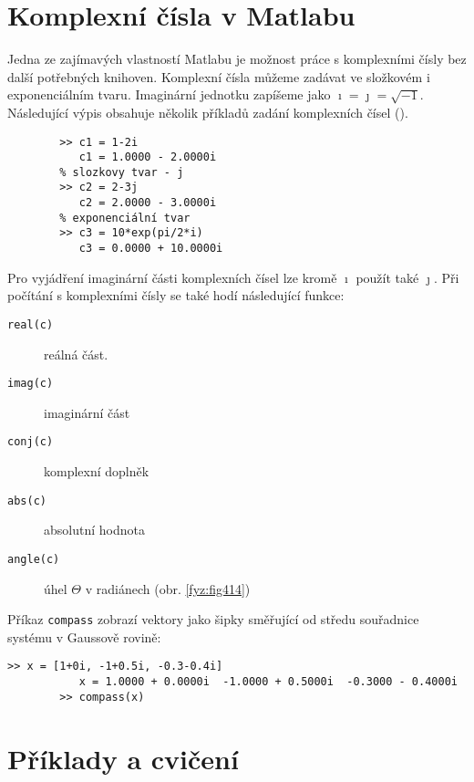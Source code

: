  \section{Komplexní čísla v Matlabu}\label{fyz:IchapXXIIsecVII}
    Jedna ze zajímavých vlastností Matlabu je možnost práce s komplexními čísly bez další potřebných
    knihoven. Komplexní čísla můžeme zadávat ve složkovém i exponenciálním tvaru. Imaginární
    jednotku zapíšeme jako \(\imath = \jmath = \sqrt{-1}\). Následující výpis obsahuje několik
    příkladů zadání komplexních čísel (\cite[s.~30]{Karban2006}).
    \begin{mdframed}[style=mdmsdos]
      \begin{lstlisting}[style=luaMaltabext,gobble=8]
        % slozkovy tvar - i
        >> c1 = 1-2i 
           c1 = 1.0000 - 2.0000i
        % slozkovy tvar - j
        >> c2 = 2-3j   
           c2 = 2.0000 - 3.0000i
        % exponenciální tvar
        >> c3 = 10*exp(pi/2*i)      
           c3 = 0.0000 + 10.0000i
      \end{lstlisting}
    \end{mdframed} 

    Pro vyjádření imaginární části komplexních čísel lze kromě \(\imath\) použít také \(\jmath\).
    Při počítání s komplexními čísly se také hodí následující funkce:
    \begin{description}
      \item[\texttt{real(c)}]    reálná část.
      \item[\texttt{imag(c)}]    imaginární část
      \item[\texttt{conj(c)}]    komplexní doplněk
      \item[\texttt{abs(c)}]     absolutní hodnota
      \item[\texttt{angle(c)}]   úhel \(\Theta\) v radiánech (obr. \ref{fyz:fig414}) 
    \end{description}  

    Příkaz \texttt{compass} zobrazí vektory jako šipky směřující od středu souřadnice systému v
    Gaussově rovině:
    \begin{mdframed}[style=mdmsdos]
      \begin{lstlisting}[style=luaMaltabext,gobble=8]
        >> x = [1+0i, -1+0.5i, -0.3-0.4i]
           x = 1.0000 + 0.0000i  -1.0000 + 0.5000i  -0.3000 - 0.4000i
        >> compass(x)
      \end{lstlisting}
    \end{mdframed} 


  \section{Příklady a cvičení}\label{fyz:IchapXXIIsecVIII}
